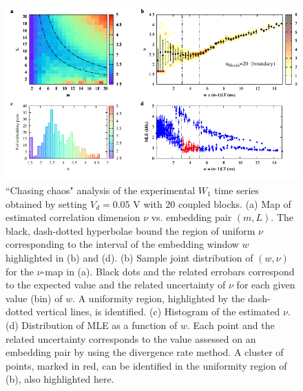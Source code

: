 \begin{figure}[H]
    \centering
    \includegraphics[width=\linewidth]{../blocks/20_blocks/2e5_points/plots/chaos_low.pdf}
    \caption{``Chasing chaos" analysis of the experimental $W_1$ time series obtained by setting $V_d=0.05$ V with 20 coupled blocks.
    (a) Map of estimated correlation dimension $\nu$ vs. embedding pair $(m, L)$.
    The black, dash-dotted hyperbolae bound the region of uniform $\nu$ corresponding to the interval of the
    embedding window $w$ highlighted in (b) and (d).
    (b) Sample joint distribution of $(w,\nu)$ for the $\nu$-map in (a).
    Black dots and the related errobars correspond to the expected value and the related uncertainty of $\nu$
    for each given value (bin) of $w$. A uniformity region, highlighted by the dash-dotted vertical lines,
    is identified. (c) Histogram of the estimated $\nu$. (d) Distribution of MLE as a function of $w$. Each point and the related
    uncertainty corresponds to the value assessed on an embedding pair by using the divergence rate method.
    A cluster of points, marked in red, can be identified in the uniformity region of (b), also highlighted here.}
    \label{fig:20 blocks chaos}
\end{figure}


